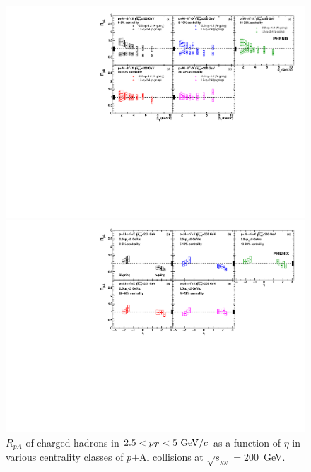 \documentclass[twocolumn,letterpaper,aps,prc,longbibliography,superscriptaddress,nofootinbib,floatfix]{revtex4-2}
\newcommand{\pt}{\mbox{$p_T$}\xspace}
\newcommand{\rpa}{\mbox{$R_{pA}$}\xspace}
\newcommand{\sqsntwo}{\mbox{$\sqrt{s_{_{NN}}}=200$~GeV}\xspace}
\newcommand{\pal}{\mbox{$p$$+$Al}\xspace}
\begin{document}
\begin{figure}[tbh]
\includegraphics[width=0.998\linewidth]{pAl_centbin_RpA_vs_pT.pdf}
\caption{\label{fig:rpa_pT_cent_pal}
\rpa of charged hadrons as a function of \pt 
at backward rapidity, $-2.2<\eta<-1.2$, Al-going (filled [black] circles) and
forward rapdity, $1.4<\eta<2.4$, $p$-going (open [red] circles) 
in various centrality classes of \pal collisions at \sqsntwo.}
\vspace*{\floatsep}
\includegraphics[width=0.998\linewidth]{pAl_centbin_RpA_vs_eta.pdf}
\caption{\label{fig:rpa_eta_cent_pal}
\rpa of charged hadrons in $2.5<p_T<5~{\rm GeV}/c$ as a function of 
$\eta$ in various centrality classes of \pal collisions at \sqsntwo.}
\end{figure}
\end{document}
